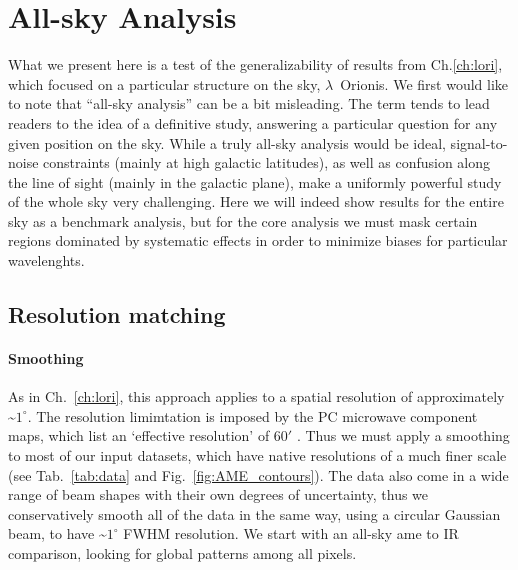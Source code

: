 \chapter{All-sky Analysis}
  \label{ch:allsky}
    What we present here is a test of the generalizability of results from Ch.\ref{ch:lori}, which focused on a particular structure on the sky, $\lambda$~Orionis.
    We first would like to note that ``all-sky analysis'' can be a bit misleading. The term tends to lead readers to the idea of a definitive study, answering a particular question for any given position on the sky.  While a truly all-sky analysis would be ideal, signal-to-noise constraints (mainly at high galactic latitudes), as well as confusion along the line of sight (mainly in the galactic plane), make a uniformly powerful study of the whole sky very challenging. Here we will indeed show results for the entire sky as a benchmark analysis, but for the core analysis we must mask certain regions dominated by systematic effects in order to minimize biases for particular wavelenghts.

\section{Resolution matching}
    \subsubsection{Smoothing}
        As in Ch.~\ref{ch:lori}, this approach applies to a spatial resolution of approximately \textasciitilde{}$1^{\circ}$. The resolution limimtation is imposed by the PC microwave component maps, which list an `effective resolution' of 60$'$ \citep{planck15X}. Thus we must apply a smoothing to most of our input datasets, which have native resolutions of a much finer scale (see Tab.~\ref{tab:data} and Fig.~\ref{fig:AME_contours}). The data also come in a wide range of beam shapes with their own degrees of uncertainty, thus we conservatively smooth all of the data in the same way, using a circular Gaussian beam, to have \textasciitilde{}$1^{\circ}$ FWHM resolution. We start with an all-sky \acrshort{ame} to IR comparison, looking for global patterns among all pixels.

